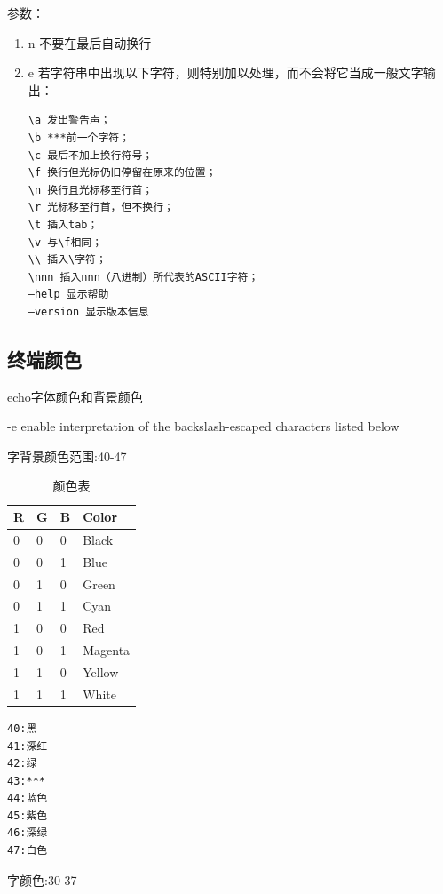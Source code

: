 参数：

\begin{enumerate}[itemsep=0pt,parsep=0pt]
\item \-n 不要在最后自动换行 
\item \-e 若字符串中出现以下字符，则特别加以处理，而不会将它当成一般文字输出： 
  \small{
\begin{verbatim}
\a 发出警告声； 
\b ***前一个字符； 
\c 最后不加上换行符号； 
\f 换行但光标仍旧停留在原来的位置； 
\n 换行且光标移至行首； 
\r 光标移至行首，但不换行； 
\t 插入tab； 
\v 与\f相同； 
\\ 插入\字符； 
\nnn 插入nnn（八进制）所代表的ASCII字符； 
–help 显示帮助 
–version 显示版本信息
\end{verbatim}
  }
  \normalsize
\end{enumerate}

\subsection{终端颜色}

echo字体颜色和背景颜色 

-e enable interpretation of the backslash-escaped characters listed below 

字背景颜色范围:40-47

\begin{table}[h]
  \centering
  \begin{tabular}{llll}
    \toprule
    R & G & B & Color \\
    \midrule
    0 & 0 & 0 & Black \\
    0 & 0 & 1 & Blue \\
    0 & 1 & 0 & Green \\
    0 & 1 & 1 & Cyan \\
    1 & 0 & 0 & Red \\
    1 & 0 & 1 & Magenta \\
    1 & 1 & 0 & Yellow \\
    1 & 1 & 1 & White \\
    \bottomrule
  \end{tabular}
  \caption{颜色表\cite{computersystem}}
  \label{tab:colorTable}
\end{table}

\small{	
\begin{verbatim}
40:黑 
41:深红 
42:绿 
43:*** 
44:蓝色 
45:紫色 
46:深绿 
47:白色
\end{verbatim}
}
\normalsize

字颜色:30-37

